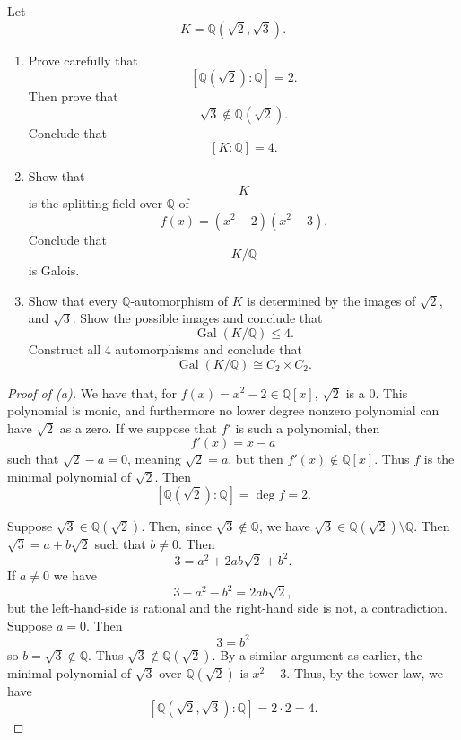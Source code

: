 \begin{prob}
    Let 
    \[
        K = \mathbb Q(\sqrt 2, \sqrt 3).
    \]
    \begin{enumerate}[label=\alph*)]
        \item Prove carefully that 
            \[
                [\mathbb Q(\sqrt 2):\mathbb Q] = 2.
            \]
            Then prove that 
            \[
                \sqrt 3 \not\in \mathbb Q(\sqrt 2). 
            \]
            Conclude that 
            \[
                [K : \mathbb Q] = 4. 
            \]
        \item Show that 
            \[
                K
            \] 
            is the splitting field over $\mathbb Q$ of 
            \[
                f(x) = (x^2 - 2)(x^2 - 3).
            \]
            Conclude that 
            \[
                K/\mathbb Q
            \]
            is Galois.
        \item Show that every $\mathbb Q$-automorphism 
            of $K$ is determined by the images 
            of $\sqrt 2$, and $\sqrt 3$. 
            Show the possible images and conclude 
            that 
            \[
                \operatorname{Gal}(K/\mathbb Q) \leq 4.  
            \]
            Construct all $4$ automorphisms and 
            conclude that  
            \[
                \operatorname{Gal}(K/\mathbb Q)
                \cong C_2 \times C_2.
            \]
    \end{enumerate}
\end{prob}
\begin{proof}[Proof of (a)]
    We have that, for $f(x) = x^2 - 2 \in 
    \mathbb Q[x]$, 
    $\sqrt 2$ is a $0$. 
    This polynomial is monic, and furthermore 
    no lower degree nonzero polynomial can have 
    $\sqrt 2$ as a zero. If we suppose 
    that $f'$ is such a polynomial, then 
    \[
        f'(x) = x - a 
    \]
    such that $\sqrt 2 - a = 0$, meaning 
    $\sqrt 2 = a$, but then $f'(x)\not\in 
    \mathbb Q[x]$.
    Thus $f$ is the minimal polynomial of 
    $\sqrt 2$.
    Then 
    \[
        [\mathbb Q(\sqrt 2) : \mathbb Q] 
        = \deg f = 2.
    \]

    Suppose $\sqrt 3 \in \mathbb Q(\sqrt 2)$. 
    Then, since $\sqrt 3 \not \in \mathbb Q$, we 
    have $\sqrt 3 \in \mathbb Q(\sqrt 2) \setminus 
    \mathbb Q$.
    Then $\sqrt 3 = a + b\sqrt 2$ such that 
    $b \neq 0$. Then 
    \[
        3 = a^2 + 2ab\sqrt 2 + b^2. 
    \]
    If $a \neq 0$ we have 
    \[
        3 - a^2 - b^2 = 2ab\sqrt 2, 
    \]
    but the left-hand-side is rational and 
    the right-hand side is not, a contradiction. 
    Suppose $a = 0$. Then 
    \[
        3 = b^2 
    \]
    so $b = \sqrt 3 \not\in \mathbb Q$. 
    Thus $\sqrt 3 \not\in \mathbb Q(\sqrt 2)$.
    By a similar argument as earlier, the minimal 
    polynomial of $\sqrt 3$ over $\mathbb Q(\sqrt 2)$ is 
    $x^2 - 3$. 
    Thus, by the tower law, we have 
    \[
        [\mathbb Q(\sqrt 2, \sqrt 3) : \mathbb Q] = 2 \cdot 2 = 4. 
    \]
\end{proof}
